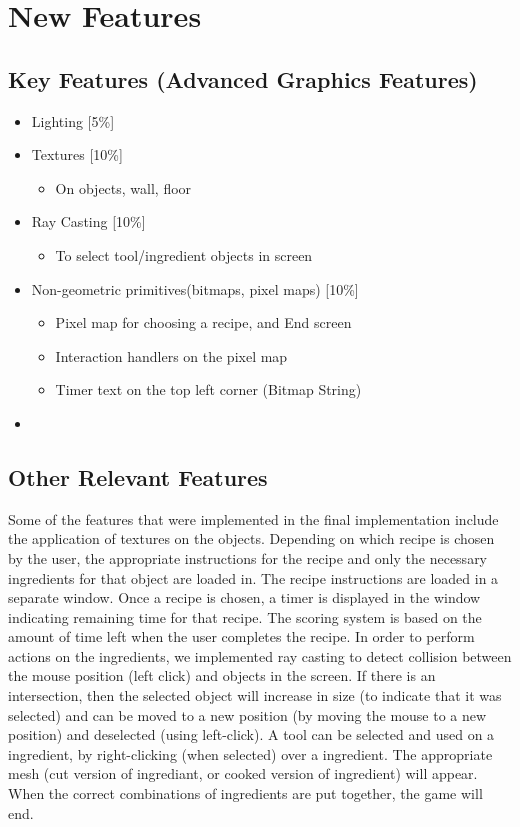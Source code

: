 \documentclass[11pt]{article}
\begin{document}
\section*{New Features}
\label{sec:orgac3d105}

\subsection*{Key Features (Advanced Graphics Features)}
\label{sec:org701e791}
\begin{itemize}
\item Lighting [5\%]
\item Textures [10\%] 
\begin{itemize}
\item On objects, wall, floor
\end{itemize}
\item Ray Casting [10\%]
\begin{itemize}
\item To select tool/ingredient objects in screen
\end{itemize}
\item Non-geometric primitives(bitmaps, pixel maps) [10\%]
\begin{itemize}
\item Pixel map for choosing a recipe, and End screen
\item Interaction handlers on the pixel map
\item Timer text on the top left corner (Bitmap String)
\end{itemize}
\item\relax [5\%]
\end{itemize}

\subsection*{Other Relevant Features}
\label{sec:orgc7815aa}
Some of the features that were implemented in the final implementation include the
 application of textures  on the objects. Depending on which recipe
is chosen by the user, the appropriate instructions for the recipe and only the 
necessary ingredients for that object are loaded in. The recipe instructions are 
loaded in a separate window.  Once a recipe is chosen, a 
timer is displayed in the window indicating remaining time for that recipe. The
scoring system is based on the amount of time left when the user completes the 
recipe. In order to perform actions on the ingredients, we implemented ray casting
 to detect collision between the mouse position (left click) and objects in the screen.
 If there is an intersection,
then the selected object will increase in size (to indicate that it was selected) and
can be moved to a new position (by moving the mouse to a new position) and deselected
 (using left-click). A tool can be selected and used on a ingredient, by right-clicking 
(when selected) over a ingredient. The appropriate mesh (cut version of ingrediant, or
cooked version of ingredient) will appear. When the correct combinations of ingredients
 are put together, the game will end.
\end{document}
